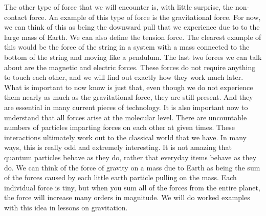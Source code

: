 The other type of force that we will encounter is, with little surprise, the non-contact force. An example of this type of force is the gravitational force. For now, we can think of this as being the downward pull that we experience due to to the large mass of Earth. We can also define the tension force. The clearest example of this would be the force of the string in a system with a mass connected to the bottom of the string and moving like a pendulum. The last two forces we can talk about are the magnetic and electric forces. These forces do not require anything to touch each other, and we will find out exactly how they work much later. What is important to now know is just that, even though we do not experience them nearly as much as the gravitational force, they are still present. And they are essential in many current pieces of technology. It is also important now to understand that all forces arise at the molecular level. There are uncountable numbers of particles imparting forces on each other at given times. These interactions ultimately work out to the classical world that we have. In many ways, this is really odd and extremely interesting. It is not amazing that quantum particles behave as they do, rather that everyday items behave as they do. We can think of the force of gravity on a mass due to Earth as being the sum of the forces caused by each little earth particle pulling on the mass. Each individual force is tiny, but when you sum all of the forces from the entire planet, the force will increase many orders in magnitude. We will do worked examples with this idea in lessons on gravitation. 
\newline
\newline
{}
\newpage
